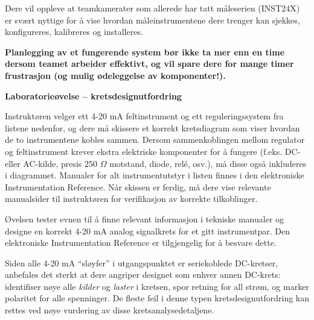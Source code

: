 Dere vil oppleve at teamkamerater som allerede har tatt måleserien (INST24X) er svært nyttige for å vise hvordan måleinstrumentene dere trenger kan sjekkes, konfigureres, kalibreres og installeres.

\vskip 10pt

{\bf Planlegging av et fungerende system bør ikke ta mer enn en time dersom teamet arbeider effektivt, og vil spare dere for mange timer frustrasjon (og mulig ødeleggelse av komponenter!).}




\vfil \eject

\noindent
{\bf Laboratorieøvelse -- kretsdesignutfordring}

\vskip 5pt

Instruktøren velger ett 4-20 mA feltinstrument og ett reguleringssystem fra listene nedenfor, og dere må skissere et korrekt kretsdiagram som viser hvordan de to instrumentene kobles sammen. Dersom sammenkoblingen mellom regulator og feltinstrument krever ekstra elektriske komponenter for å fungere (f.eks. DC- eller AC-kilde, presis 250 $\Omega$ motstand, diode, relé, osv.), må disse også inkluderes i diagrammet. Manualer for alt instrumentutstyr i listen finnes i den elektroniske Instrumentation Reference. Når skissen er ferdig, må dere vise relevante manualsider til instruktøren for verifikasjon av korrekte tilkoblinger.

Øvelsen tester evnen til å finne relevant informasjon i tekniske manualer og designe en korrekt 4-20 mA analog signalkrets for et gitt instrumentpar. Den elektroniske Instrumentation Reference er tilgjengelig for å besvare dette.

\vskip 10pt

Siden alle 4-20 mA ``sløyfer'' i utgangspunktet er seriekoblede DC-kretser, anbefales det sterkt at dere angriper designet som enhver annen DC-krets: identifiser nøye alle {\it kilder} og {\it laster} i kretsen, spor retning for all strøm, og marker polaritet for alle spenninger. De fleste feil i denne typen kretsdesignutfordring kan rettes ved nøye vurdering av disse kretsanalysedetaljene.

